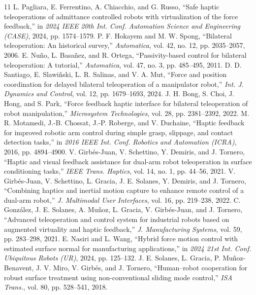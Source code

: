 \documentclass[journal]{IEEEtran}
\begin{document}
\begin{thebibliography}{11}
 L. Pagliara, E. Ferrentino, A. Chiacchio, and G. Russo, ``Safe haptic teleoperations of admittance controlled robots with virtualization of the force feedback,'' in \emph{2024 IEEE 20th Int. Conf. Automation Science and Engineering (CASE)}, 2024, pp. 1574--1579.
 P. F. Hokayem and M. W. Spong, ``Bilateral teleoperation: An historical survey,'' \emph{Automatica}, vol. 42, no. 12, pp. 2035--2057, 2006.
 E. Nu\~no, L. Basa\~nez, and R. Ortega, ``Passivity-based control for bilateral teleoperation: A tutorial,'' \emph{Automatica}, vol. 47, no. 3, pp. 485--495, 2011.
 D. D. Santiago, E. Slawi\~nski, L. R. Salinas, and V. A. Mut, ``Force and position coordination for delayed bilateral teleoperation of a manipulator robot,'' \emph{Int. J. Dynamics and Control}, vol. 12, pp. 1679--1693, 2024.
 J. H. Bong, S. Choi, J. Hong, and S. Park, ``Force feedback haptic interface for bilateral teleoperation of robot manipulation,'' \emph{Microsystem Technologies}, vol. 28, pp. 2381--2392, 2022.
 M. R. Motamedi, J.-B. Chossat, J.-P. Roberge, and V. Duchaine, ``Haptic feedback for improved robotic arm control during simple grasp, slippage, and contact detection tasks,'' in \emph{2016 IEEE Int. Conf. Robotics and Automation (ICRA)}, 2016, pp. 4894--4900.
 V. Girb\'es-Juan, V. Schettino, Y. Demiris, and J. Tornero, ``Haptic and visual feedback assistance for dual-arm robot teleoperation in surface conditioning tasks,'' \emph{IEEE Trans. Haptics}, vol. 14, no. 1, pp. 44--56, 2021.
 V. Girb\'es-Juan, V. Schettino, L. Gracia, J. E. Solanes, Y. Demiris, and J. Tornero, ``Combining haptics and inertial motion capture to enhance remote control of a dual-arm robot,'' \emph{J. Multimodal User Interfaces}, vol. 16, pp. 219--238, 2022.
 C. Gonz\'alez, J. E. Solanes, A. Mu\~noz, L. Gracia, V. Girb\'es-Juan, and J. Tornero, ``Advanced teleoperation and control system for industrial robots based on augmented virtuality and haptic feedback,'' \emph{J. Manufacturing Systems}, vol. 59, pp. 283--298, 2021.
 E. Nasiri and L. Wang, ``Hybrid force motion control with estimated surface normal for manufacturing applications,'' in \emph{2024 21st Int. Conf. Ubiquitous Robots (UR)}, 2024, pp. 125--132.
 J. E. Solanes, L. Gracia, P. Mu\~noz-Benavent, J. V. Miro, V. Girb\'es, and J. Tornero, ``Human--robot cooperation for robust surface treatment using non-conventional sliding mode control,'' \emph{ISA Trans.}, vol. 80, pp. 528--541, 2018.
\end{thebibliography}
\end{document}
